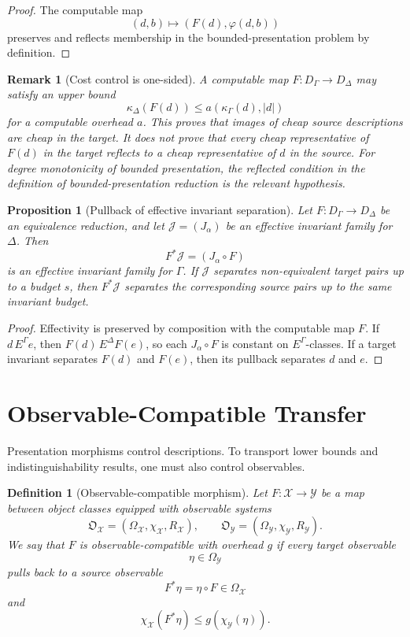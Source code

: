 \documentclass[11pt]{article}
\newtheorem{proposition}[theorem]{Proposition}
\newtheorem{definition}[theorem]{Definition}
\newtheorem{remark}[theorem]{Remark}
\begin{document}
\begin{proof}
The computable map
\[
(d,b)\longmapsto (F(d),\varphi(d,b))
\]
preserves and reflects membership in the bounded-presentation problem by definition.
\end{proof}

\begin{remark}[Cost control is one-sided]
A computable map \(F:D_\Gamma\to D_\Delta\) may satisfy an upper bound
\[
\kappa_\Delta(F(d))\leq a(\kappa_\Gamma(d),|d|)
\]
for a computable overhead \(a\).  This proves that images of cheap source descriptions are cheap in the target.  It does not prove that every cheap representative of \(F(d)\) in the target reflects to a cheap representative of \(d\) in the source.  For degree monotonicity of bounded presentation, the reflected condition in the definition of bounded-presentation reduction is the relevant hypothesis.
\end{remark}

\begin{proposition}[Pullback of effective invariant separation]
Let \(F:D_\Gamma\to D_\Delta\) be an equivalence reduction, and let \(\mathcal J=(J_\alpha)\) be an effective invariant family for \(\Delta\).  Then
\[
F^*\mathcal J=(J_\alpha\circ F)
\]
is an effective invariant family for \(\Gamma\).  If \(\mathcal J\) separates non-equivalent target pairs up to a budget \(s\), then \(F^*\mathcal J\) separates the corresponding source pairs up to the same invariant budget.
\end{proposition}

\begin{proof}
Effectivity is preserved by composition with the computable map \(F\).  If \(d\,E^\Gamma e\), then \(F(d)\,E^\Delta F(e)\), so each \(J_\alpha\circ F\) is constant on \(E^\Gamma\)-classes.  If a target invariant separates \(F(d)\) and \(F(e)\), then its pullback separates \(d\) and \(e\).
\end{proof}

\section{Observable-Compatible Transfer}

Presentation morphisms control descriptions. To transport lower bounds and indistinguishability results, one must also control observables.

\begin{definition}[Observable-compatible morphism]
Let \(F:\mathcal X\to\mathcal Y\) be a map between object classes equipped with observable systems
\[
\mathfrak O_\mathcal X=(\Omega_\mathcal X,\chi_\mathcal X,R_\mathcal X),
\qquad
\mathfrak O_\mathcal Y=(\Omega_\mathcal Y,\chi_\mathcal Y,R_\mathcal Y).
\]
We say that \(F\) is observable-compatible with overhead \(g\) if every target observable
\[
\eta\in\Omega_\mathcal Y
\]
pulls back to a source observable
\[
F^\ast\eta=\eta\circ F\in\Omega_\mathcal X
\]
and
\[
\chi_\mathcal X(F^\ast\eta)
\leq
g(\chi_\mathcal Y(\eta)).
\]
\end{definition}
\end{document}
